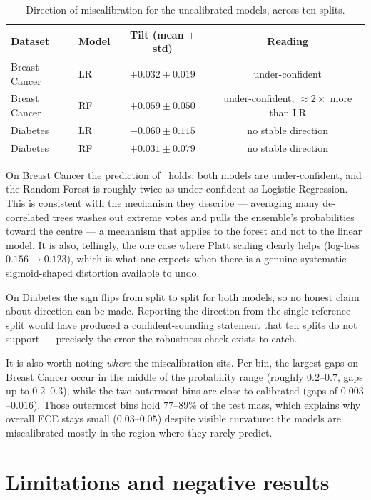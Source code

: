 \documentclass[11pt,a4paper]{article}
\begin{document}
\begin{table}[h]
\centering
\small
\begin{tabular}{llcc}
\toprule
\textbf{Dataset} & \textbf{Model} & \textbf{Tilt (mean $\pm$ std)} & \textbf{Reading} \\
\midrule
Breast Cancer & LR & $+0.032 \pm 0.019$ & under-confident \\
Breast Cancer & RF & $\mathbf{+0.059 \pm 0.050}$ & under-confident, $\approx 2\times$ more than LR \\
Diabetes      & LR & $-0.060 \pm 0.115$ & no stable direction \\
Diabetes      & RF & $+0.031 \pm 0.079$ & no stable direction \\
\bottomrule
\end{tabular}
\caption{Direction of miscalibration for the uncalibrated models, across ten splits.}
\label{tab:tilt}
\end{table}

On Breast Cancer the prediction of~\cite{nm2005} holds: both models are under-confident, and the Random
Forest is roughly twice as under-confident as Logistic Regression. This is consistent with the mechanism
they describe --- averaging many de-correlated trees washes out extreme votes and pulls the ensemble's
probabilities toward the centre --- a mechanism that applies to the forest and not to the linear model.
It is also, tellingly, the one case where Platt scaling clearly helps (log-loss $0.156 \to 0.123$), which
is what one expects when there is a genuine systematic sigmoid-shaped distortion available to undo.

On Diabetes the sign flips from split to split for both models, so no honest claim about direction can be
made. Reporting the direction from the single reference split would have produced a confident-sounding
statement that ten splits do not support --- precisely the error the robustness check exists to catch.

It is also worth noting \emph{where} the miscalibration sits. Per bin, the largest gaps on Breast Cancer
occur in the middle of the probability range (roughly $0.2$--$0.7$, gaps up to $0.2$--$0.3$), while the two
outermost bins are close to calibrated (gaps of $0.003$--$0.016$). Those outermost bins hold $77$--$89\%$
of the test mass, which explains why overall ECE stays small ($0.03$--$0.05$) despite visible curvature:
the models are miscalibrated mostly in the region where they rarely predict.

\section{Limitations and negative results}
\label{sec:limits}
\end{document}
